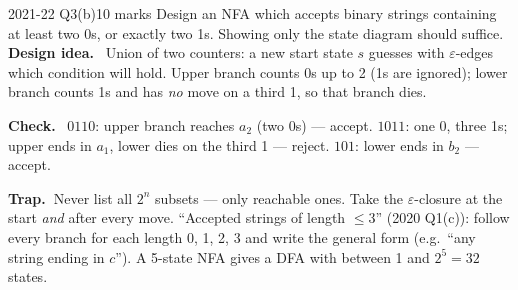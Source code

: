\documentclass[10.5pt,a4paper]{article}
\newcommand{\TRAP}{\textbf{\color{trapborder}Trap.\ }}
\newcommand{\ansh}[1]{\textbf{\color{exborder}#1}\ }
\newcommand{\eps}{\varepsilon}
\begin{document}
\begin{examq}{2021-22 Q3(b)}{10 marks}
Design an NFA which accepts binary strings containing at least two 0s, or exactly two 1s. Showing only the state diagram should suffice.
\tcblower
\ansh{Design idea.} Union of two counters: a new start state $s$ guesses with $\eps$-edges which condition will hold. Upper branch counts 0s
up to 2 (1s are ignored); lower branch counts 1s and has \emph{no} move on a third 1, so that branch dies.
\begin{center}
\end{center}
\ansh{Check.} $0110$: upper branch reaches $a_2$ (two 0s) --- accept. $1011$: one 0, three 1s; upper ends in $a_1$, lower dies on the
third 1 --- reject. $101$: lower ends in $b_2$ --- accept.
\end{examq}

\begin{trap}\TRAP Never list all $2^n$ subsets --- only reachable ones. Take the $\eps$-closure at the start \emph{and} after every move.
``Accepted strings of length $\le3$'' (2020 Q1(c)): follow every branch for each length 0, 1, 2, 3 and write the general form
(e.g.\ ``any string ending in $c$''). A 5-state NFA gives a DFA with between 1 and $2^5=32$ states.\end{trap}

\end{document}
